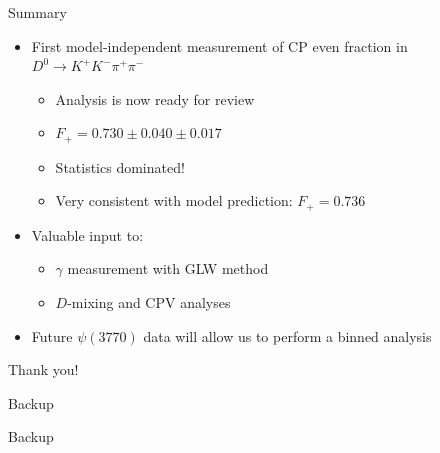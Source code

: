 \documentclass{beamer}
\begin{document}
\begin{frame}{Summary}
  \begin{itemize}
    \setlength\itemsep{1.0em}
    \item{First model-independent measurement of CP even fraction in $D^0\to K^+K^-\pi^+\pi^-$}
    \begin{itemize}
      \item{Analysis is now ready for review}
      \item{$F_+ = 0.730 \pm 0.040 \pm 0.017$}
      \item{Statistics dominated!}
      \item{Very consistent with model prediction: $F_+ = 0.736$}
    \end{itemize}
    \item{Valuable input to:}
    \begin{itemize}
      \item{$\gamma$ measurement with GLW method}
      \item{$D$-mixing and CPV analyses}
    \end{itemize}
    \item{Future $\psi(3770)$ data will allow us to perform a binned analysis}
  \end{itemize}
  \vspace{0.4cm}
  \begin{center}
    {\huge Thank you!}
  \end{center}
\end{frame}

\begin{frame}{Backup}
  \begin{center}
    {\huge Backup}
  \end{center}
\end{frame}
\end{document}
